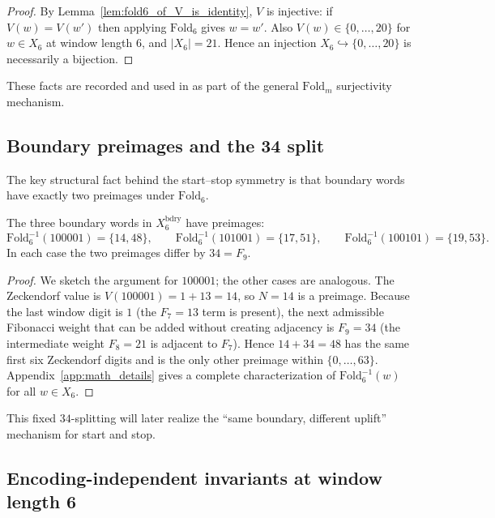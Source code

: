 \begin{proof}
By Lemma~\ref{lem:fold6_of_V_is_identity}, $V$ is injective: if $V(w)=V(w')$ then applying $\mathrm{Fold}_6$ gives $w=w'$.
Also $V(w)\in\{0,\dots,20\}$ for $w\in X_6$ at window length $6$, and $|X_6|=21$.
Hence an injection $X_6\hookrightarrow\{0,\dots,20\}$ is necessarily a bijection.
\end{proof}

These facts are recorded and used in \cite{Ma2025RF} as part of the general $\mathrm{Fold}_m$ surjectivity mechanism.

\subsection{Boundary preimages and the 34 split}
\label{sec:boundary_preimages}

The key structural fact behind the start--stop symmetry is that boundary words have exactly two preimages under $\mathrm{Fold}_6$.

\begin{proposition}
\label{prop:boundary_preimages}
The three boundary words in $X_6^{\mathrm{bdry}}$ have preimages:
\[
\mathrm{Fold}_6^{-1}(100001)=\{14,48\},\qquad
\mathrm{Fold}_6^{-1}(101001)=\{17,51\},\qquad
\mathrm{Fold}_6^{-1}(100101)=\{19,53\}.
\]
In each case the two preimages differ by $34=F_9$.
\end{proposition}

\begin{proof}
We sketch the argument for $100001$; the other cases are analogous.
The Zeckendorf value is $V(100001)=1+13=14$, so $N=14$ is a preimage.
Because the last window digit is $1$ (the $F_7=13$ term is present), the next admissible Fibonacci weight that can be added without creating adjacency is $F_9=34$ (the intermediate weight $F_8=21$ is adjacent to $F_7$).
Hence $14+34=48$ has the same first six Zeckendorf digits and is the only other preimage within $\{0,\dots,63\}$.
Appendix~\ref{app:math_details} gives a complete characterization of $\mathrm{Fold}_6^{-1}(w)$ for all $w\in X_6$.
\end{proof}

This fixed $34$-splitting will later realize the ``same boundary, different uplift'' mechanism for start and stop.

\subsection{Encoding-independent invariants at window length 6}
\label{sec:fold6_invariants}

